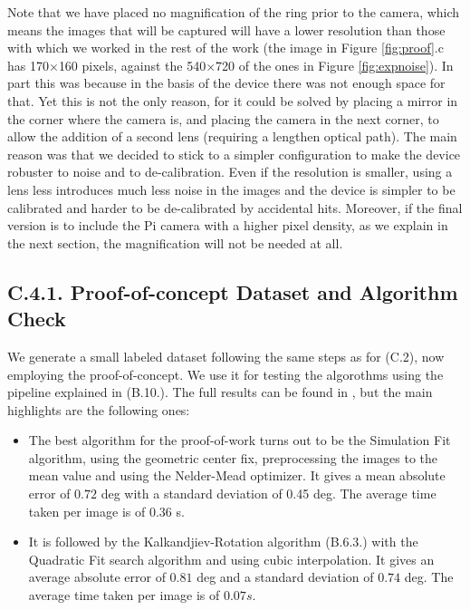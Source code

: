 \documentclass[11pt, a4paper, twoside]{article} %
\begin{document}
Note that we have placed no magnification of the ring prior to the camera, which means the images that will be captured will have a lower resolution than those with which we worked in the rest of the work (the image in Figure \ref{fig:proof}.c has 170$\times$160 pixels, against the 540$\times$720 of the ones in Figure \ref{fig:expnoise}). In part this was because in the basis of the device there was not enough space for that. Yet this is not the only reason, for it could be solved by placing a mirror in the corner where the camera is, and placing the camera in the next corner, to allow the addition of a second lens (requiring a lengthen optical path). The main reason was that we decided to stick to a simpler configuration to make the device robuster to noise and to de-calibration. Even if the resolution is smaller, using a lens less introduces much less noise in the images and the device is simpler to be calibrated and harder to be de-calibrated by accidental hits. Moreover, if the final version is to include the Pi camera with a higher pixel density, as we explain in the next section, the magnification will not be needed at all.\vspace{-0.1cm}

\subsection*{C.4.1. Proof-of-concept Dataset and Algorithm Check \vspace{-0.1cm}}

We generate a small labeled dataset following the same steps as for (C.2), now employing the proof-of-concept. We use it for testing the algorothms using the pipeline explained in (B.10.). The full results can be found in \cite{github}, but the main highlights are the following ones:\vspace{-0.2cm}
\begin{itemize}
\item The best algorithm for the proof-of-work turns out to be the Simulation Fit algorithm, using the geometric center fix, preprocessing the images to the mean value and using the Nelder-Mead optimizer. It gives a mean absolute error of $0.72$ deg with a standard deviation of 0.45 deg. The average time taken per image is of 0.36 s.\vspace{-0.1cm}

\item It is followed by the Kalkandjiev-Rotation algorithm (B.6.3.) with the Quadratic Fit search algorithm and using cubic interpolation. It gives an average absolute error of $0.81$ deg and a standard deviation of $0.74$ deg. The average time taken per image is of $0.07s$.\vspace{-0.3cm}
\end{itemize}
\end{document}
